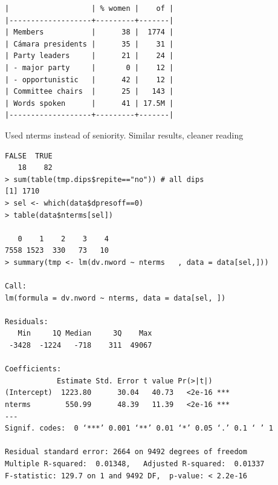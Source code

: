 \documentclass[letter,12pt]{article}
\begin{document}
  


  \begin{footnotesize}
    \begin{verbatim}
|                   | % women |    of |
|-------------------+---------+-------|
| Members           |      38 |  1774 |
| Cámara presidents |      35 |    31 |
| Party leaders     |      21 |    24 |
| - major party     |       0 |    12 |
| - opportunistic   |      42 |    12 |
| Committee chairs  |      25 |   143 |
| Words spoken      |      41 | 17.5M |
|-------------------+---------+-------|
    \end{verbatim}
  \end{footnotesize}

  

Used nterms instead of seniority. Similar results, cleaner reading
  
  \begin{footnotesize}
    \begin{verbatim}
FALSE  TRUE 
   18    82 
> sum(table(tmp.dips$repite=="no")) # all dips
[1] 1710
> sel <- which(data$dpresoff==0)
> table(data$nterms[sel])

   0    1    2    3    4 
7558 1523  330   73   10 
> summary(tmp <- lm(dv.nword ~ nterms   , data = data[sel,]))

Call:
lm(formula = dv.nword ~ nterms, data = data[sel, ])

Residuals:
   Min     1Q Median     3Q    Max 
 -3428  -1224   -718    311  49067 

Coefficients:
            Estimate Std. Error t value Pr(>|t|)    
(Intercept)  1223.80      30.04   40.73   <2e-16 ***
nterms        550.99      48.39   11.39   <2e-16 ***
---
Signif. codes:  0 ‘***’ 0.001 ‘**’ 0.01 ‘*’ 0.05 ‘.’ 0.1 ‘ ’ 1

Residual standard error: 2664 on 9492 degrees of freedom
Multiple R-squared:  0.01348,	Adjusted R-squared:  0.01337 
F-statistic: 129.7 on 1 and 9492 DF,  p-value: < 2.2e-16
    \end{verbatim}
  \end{footnotesize}
\end{document}
